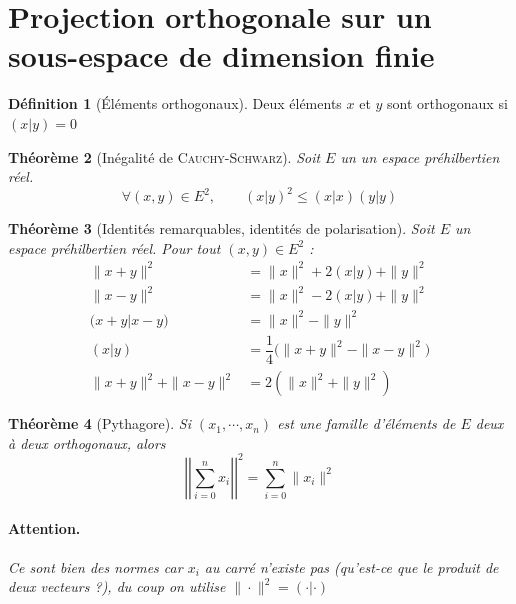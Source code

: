 \documentclass[11pt,a4paper]{report}
\newtheorem{theorem}{Théorème}[chapter]
\newtheorem{itheorem}[theorem]{Théorème}
\theoremstyle{definition}
\newtheorem{dfn}[theorem]{Définition}
\begin{document}
\section{Projection orthogonale sur un sous-espace de dimension finie}
\begin{dfn}[Éléments orthogonaux]
Deux éléments $x$ et $y$ sont orthogonaux si $(x|y)=0$
\end{dfn}
\begin{itheorem}[Inégalité de \textsc{Cauchy}-\textsc{Schwarz}]
     Soit $E$ un un espace préhilbertien réel. 
     \begin{equation}\label{eq:cauchy_swharz_scalaire}
     \forall (x,y)\in E^2,\qquad (x|y)^2 \le (x|x)(y|y)
     \end{equation}
\end{itheorem}
\begin{theorem}[Identités remarquables, identités de polarisation]
     Soit $E$ un espace préhilbertien réel. Pour tout $(x,y)\in E^2$ :
     \begin{subequations}
          \begin{align}
                \|x+y\|^2 &= \|x\|^2 + 2(x|y) + \|y\|^2 \\
                \|x-y\|^2 &= \|x\|^2 - 2(x|y) + \|y\|^2 \\
                \big( x+y \big| x-y \big) &= \| x \|^2 - \| y \|^2 \\
               (x| y) &= \dfrac{1}{4}\Big( \| x+y\|^2 - \| x-y \|^2\Big) \label{eq:identite_de_polarisation} \\
               \| x + y \|^2 + \| x - y \|^2 &= 2(\| x \|^2 + \|y\|^2)
          \end{align}
     \end{subequations}
\end{theorem}
\begin{theorem}[Pythagore]
Si $(x_1, \cdots , x_n)$ est une famille d'éléments de $E$ deux à deux \emph{orthogonaux}, alors 
\begin{equation}
\left| \left| \sum_{i=0}^{n} x_i \right| \right| ^2 = \sum_{i=0}^n  \| x_i\| ^2
\end{equation}
\paragraph{Attention.} Ce sont bien des normes car $x_i$ au carré n'existe pas (qu'est-ce que le produit de deux vecteurs ?), du coup on utilise $\| \cdot \| ^2 = (\cdot | \cdot )$
\end{theorem}
\end{document}
